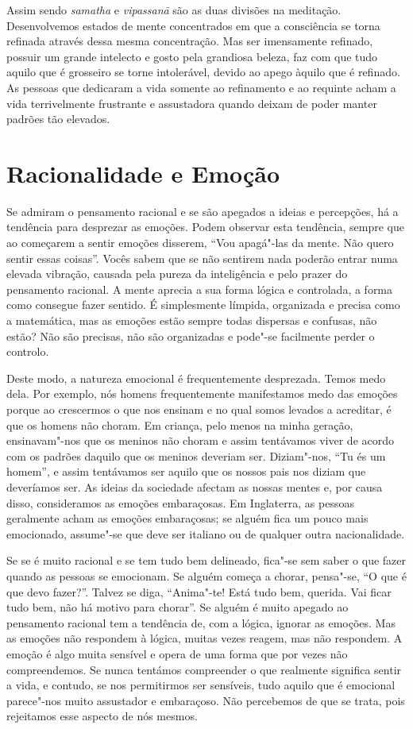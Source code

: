 Assim sendo \emph{samatha} e \emph{vipassanā} são as duas divisões na meditação.
Desenvolvemos estados de mente concentrados em que a consciência se torna
refinada através dessa mesma concentração. Mas ser imensamente refinado, possuir
um grande intelecto e gosto pela grandiosa beleza, faz com que tudo aquilo que é
grosseiro se torne intolerável, devido ao apego àquilo que é refinado. As
pessoas que dedicaram a vida somente ao refinamento e ao requinte acham a vida
terrivelmente frustrante e assustadora quando deixam de poder manter padrões tão
elevados.

\section{Racionalidade e Emoção}

Se admiram o pensamento racional e se são apegados a ideias e percepções, há a
tendência para desprezar as emoções. Podem observar esta tendência, sempre que
ao começarem a sentir emoções disserem, “Vou apagá"-las da mente. Não quero
sentir essas coisas”. Vocês sabem que se não sentirem nada poderão entrar numa
elevada vibração, causada pela pureza da inteligência e pelo prazer do
pensamento racional. A mente aprecia a sua forma lógica e controlada, a forma
como consegue fazer sentido. É simplesmente límpida, organizada e precisa como a
matemática, mas as emoções estão sempre todas dispersas e confusas, não estão?
Não são precisas, não são organizadas e pode"-se facilmente perder o controlo.

Deste modo, a natureza emocional é frequentemente desprezada. Temos medo dela.
Por exemplo, nós homens frequentemente manifestamos medo das emoções porque ao
crescermos o que nos ensinam e no qual somos levados a acreditar, é que os homens
não choram. Em criança, pelo menos na minha geração, ensinavam"-nos que os
meninos não choram e assim tentávamos viver de acordo com os padrões daquilo que
os meninos deveriam ser. Diziam"-nos, “Tu és um homem”, e assim tentávamos ser
aquilo que os nossos pais nos diziam que deveríamos ser. As ideias da sociedade
afectam as nossas mentes e, por causa disso, consideramos as emoções
embaraçosas. Em Inglaterra, as pessoas geralmente acham as emoções embaraçosas;
se alguém fica um pouco mais emocionado, assume"-se que deve ser italiano ou de
qualquer outra nacionalidade.

Se se é muito racional e se tem tudo bem delineado, fica"-se sem saber o que
fazer quando as pessoas se emocionam. Se alguém começa a chorar, pensa"-se, “O
que é que devo fazer?”. Talvez se diga, “Anima"-te! Está tudo bem, querida. Vai
ficar tudo bem, não há motivo para chorar”. Se alguém é muito apegado ao
pensamento racional tem a tendência de, com a lógica, ignorar as emoções. Mas as
emoções não respondem à lógica, muitas vezes reagem, mas não respondem. A emoção é
algo muita sensível e opera de uma forma que por vezes não compreendemos.
Se nunca tentámos compreender o que realmente significa sentir a vida, e
contudo, se nos permitirmos ser sensíveis, tudo aquilo que é emocional parece"-nos
muito assustador e embaraçoso. Não percebemos de que se trata, pois
rejeitamos esse aspecto de nós mesmos.

